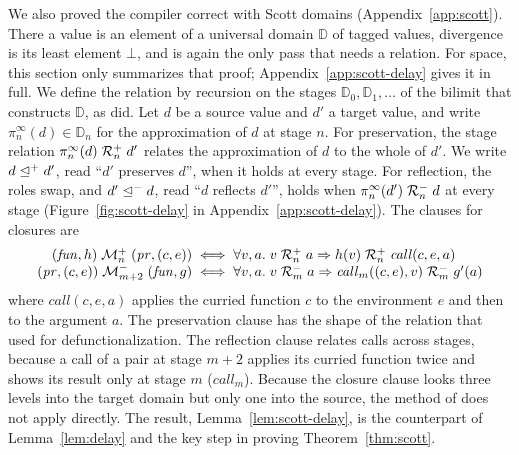 We also proved the compiler correct with Scott domains
(Appendix~\ref{app:scott}). There a value is an element of a
universal domain $\mathbb{D}$ of tagged values, divergence is its least
element $\bot$, and  is again
the only pass that needs a relation. For space, this section only
summarizes that proof; Appendix~\ref{app:scott-delay} gives it in
full. We define the relation by
recursion on the stages $\mathbb{D}_0, \mathbb{D}_1, \ldots$ of the
bilimit that constructs $\mathbb{D}$, as \citet{Reynolds:1974aa} did.
Let $d$ be a source value and $d'$ a target value, and write
$\pi^\infty_n(d) \in \mathbb{D}_n$ for the approximation of $d$ at
stage $n$. For preservation, the stage relation
$\pi^\infty_n(d) \mathrel{\mathcal{R}^{+}_{n}} d'$ relates the approximation of $d$ to the
whole of $d'$. We write $d \mathrel{\trianglelefteq^{+}} d'$, read ``$d'$ preserves $d$'',
when it holds at every stage. For reflection, the roles swap, and
$d' \mathrel{\trianglelefteq^{-}} d$, read ``$d$ reflects $d'$'', holds when
$\pi^\infty_n(d') \mathrel{\mathcal{R}^{-}_{n}} d$ at every stage
(Figure~\ref{fig:scott-delay} in Appendix~\ref{app:scott-delay}).
The clauses for closures are
\[
\begin{array}{@{}r@{\;}c@{\;}l@{}}
  (\mathit{fun}, h) \mathrel{\mathcal{M}^{+}_n} (\mathit{pr}, (c, e))
    & \iff & \forall v, a.\;
      v \SR{+}{n} a \Rightarrow h(v) \SR{+}{n} \mathit{call}(c, e, a)\\
  (\mathit{pr}, (c, e)) \mathrel{\mathcal{M}^{-}_{m+2}} (\mathit{fun}, g)
    & \iff & \forall v, a.\;
      v \SR{-}{m} a \Rightarrow \mathit{call}_m((c, e), v) \SR{-}{m} g'(a)
\end{array}
\]
where $\mathit{call}(c, e, a)$ applies the curried function $c$ to the environment
$e$ and then to the argument $a$. The preservation clause has the
shape of the relation that \citet{Nielsen:2000aa} used for
defunctionalization. The reflection clause relates calls across
stages, because a call of a pair at stage $m + 2$ applies its curried
function twice and shows its result only at stage $m$
($\mathit{call}_m$). Because the closure clause looks three levels
into the target domain but only one into the source, the method of
\citet{Pitts:1996aa} does not apply directly. The result,
Lemma~\ref{lem:scott-delay}, is the counterpart of
Lemma~\ref{lem:delay} and the key step in proving
Theorem~\ref{thm:scott}.

